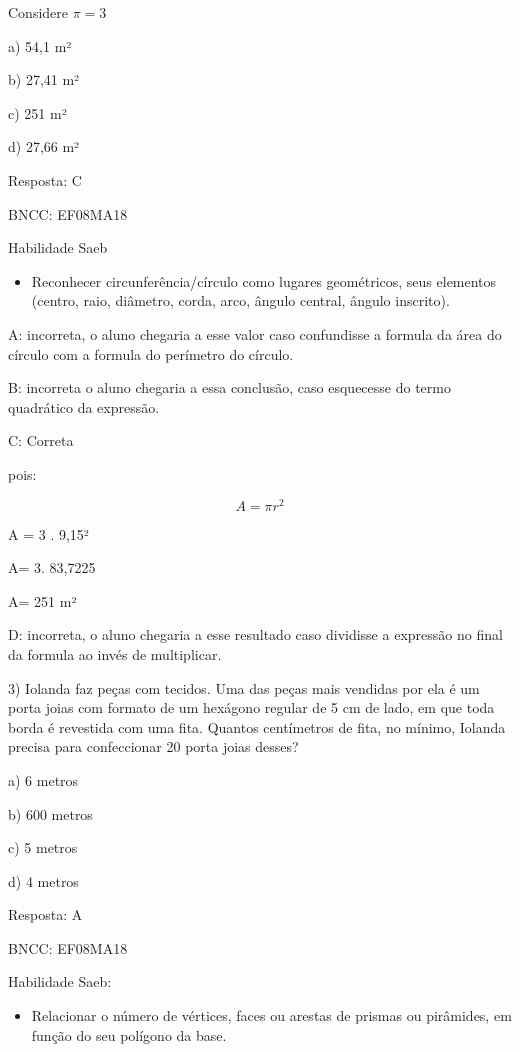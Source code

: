 {Considere \(\pi = 3\)

a) 54,1 m²

b) 27,41 m²

c) 251 m²

d) 27,66 m²

Resposta: C

BNCC: EF08MA18

Habilidade Saeb

\begin{itemize}
\tightlist
\item
  Reconhecer circunferência/círculo como lugares geométricos, seus
  elementos (centro, raio, diâmetro, corda, arco, ângulo central, ângulo
  inscrito).
\end{itemize}

A: incorreta, o aluno chegaria a esse valor caso confundisse a formula
da área do círculo com a formula do perímetro do círculo.

B: incorreta o aluno chegaria a essa conclusão, caso esquecesse do termo
quadrático da expressão.

C: Correta

pois:

\[A = \pi r^{2}\]

A = 3 . 9,15²

A= 3. 83,7225

A= 251 m²

D: incorreta, o aluno chegaria a esse resultado caso dividisse a
expressão no final da formula ao invés de multiplicar.

3) Iolanda faz peças com tecidos. Uma das peças mais vendidas por ela é
um porta joias com formato de um hexágono regular de 5 cm de lado, em
que toda borda é revestida com uma fita. Quantos centímetros de fita, no
mínimo, Iolanda precisa para confeccionar 20 porta joias desses?

a) 6 metros

b) 600 metros

c) 5 metros

d) 4 metros

Resposta: A

BNCC: EF08MA18

Habilidade Saeb:

\begin{itemize}
\tightlist
\item
  Relacionar o número de vértices, faces ou arestas de prismas ou
  pirâmides, em função do seu polígono da base.
\end{itemize}

}
